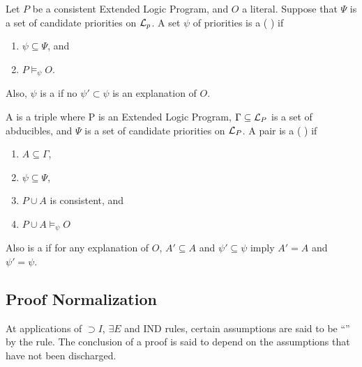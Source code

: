 \begin{defi}
Let $P$ be a consistent Extended Logic Program, and $O$ a literal. Suppose that $\Psi$ is a set of candidate priorities on $\mathcal{L}_p$. A set $\psi$ of priorities is a  (\wrtTx{} ) if
\begin{enumerate}
 \item $\psi\subseteq\Psi$, and
 \item $P\vDash_\psi O$.
\end{enumerate}
Also, $\psi$ is a  if no $\psi'\subset\psi$ is an explanation of $O$.
\cite{conf/ijcai/InoueS99}
\end{defi}

\begin{defi}
A  is a triple  where P is an Extended Logic Program, $\Gamma\subseteq\mathcal{L}_P$ is a set of abducibles, and $\Psi$ is a set of candidate priorities on $\mathcal{L}_P$. A pair  is a  (\wrtTx{} ) if
\begin{enumerate}
 \item $A\subseteq\Gamma$,
 \item $\psi\subseteq\Psi$,
 \item $P\cup A$ is consistent, and 
 \item $P\cup A\vDash_\psi O$
\end{enumerate}
Also  is a  if for any explanation  of $O$, $A'\subseteq A$ and $\psi'\subseteq\psi$ imply $A'=A$ and $\psi'=\psi$.
\cite{conf/ijcai/InoueS99}
\end{defi}

\subsection{Proof Normalization}

\begin{defi}
At applications of $\supset I$, $\exists E$ and $\mbox{IND}$ rules, certain assumptions are said to be ``'' by the rule. The conclusion of a proof is said to depend on the assumptions that have not been discharged.
\cite{conf/ijcai/Goto85}
\end{defi}

